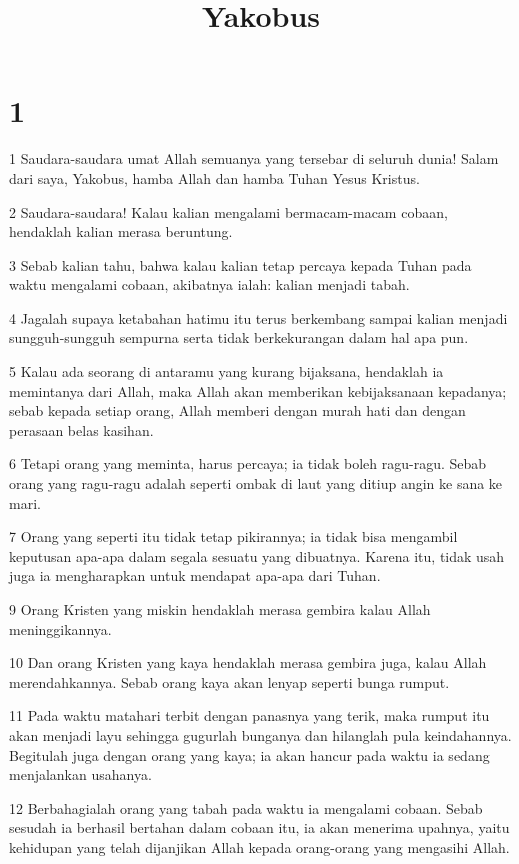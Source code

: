 

\title{Yakobus}


\chapter{1}

\par 1 Saudara-saudara umat Allah semuanya yang tersebar di seluruh dunia! Salam dari saya, Yakobus, hamba Allah dan hamba Tuhan Yesus Kristus.
\par 2 Saudara-saudara! Kalau kalian mengalami bermacam-macam cobaan, hendaklah kalian merasa beruntung.
\par 3 Sebab kalian tahu, bahwa kalau kalian tetap percaya kepada Tuhan pada waktu mengalami cobaan, akibatnya ialah: kalian menjadi tabah.
\par 4 Jagalah supaya ketabahan hatimu itu terus berkembang sampai kalian menjadi sungguh-sungguh sempurna serta tidak berkekurangan dalam hal apa pun.
\par 5 Kalau ada seorang di antaramu yang kurang bijaksana, hendaklah ia memintanya dari Allah, maka Allah akan memberikan kebijaksanaan kepadanya; sebab kepada setiap orang, Allah memberi dengan murah hati dan dengan perasaan belas kasihan.
\par 6 Tetapi orang yang meminta, harus percaya; ia tidak boleh ragu-ragu. Sebab orang yang ragu-ragu adalah seperti ombak di laut yang ditiup angin ke sana ke mari.
\par 7 Orang yang seperti itu tidak tetap pikirannya; ia tidak bisa mengambil keputusan apa-apa dalam segala sesuatu yang dibuatnya. Karena itu, tidak usah juga ia mengharapkan untuk mendapat apa-apa dari Tuhan.
\par 9 Orang Kristen yang miskin hendaklah merasa gembira kalau Allah meninggikannya.
\par 10 Dan orang Kristen yang kaya hendaklah merasa gembira juga, kalau Allah merendahkannya. Sebab orang kaya akan lenyap seperti bunga rumput.
\par 11 Pada waktu matahari terbit dengan panasnya yang terik, maka rumput itu akan menjadi layu sehingga gugurlah bunganya dan hilanglah pula keindahannya. Begitulah juga dengan orang yang kaya; ia akan hancur pada waktu ia sedang menjalankan usahanya.
\par 12 Berbahagialah orang yang tabah pada waktu ia mengalami cobaan. Sebab sesudah ia berhasil bertahan dalam cobaan itu, ia akan menerima upahnya, yaitu kehidupan yang telah dijanjikan Allah kepada orang-orang yang mengasihi Allah.
